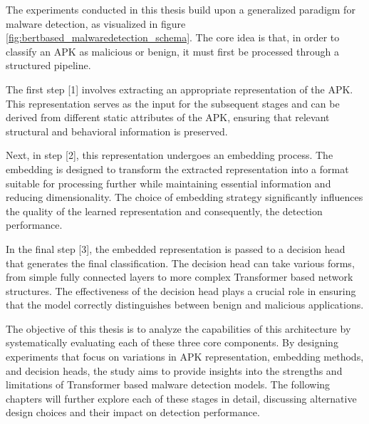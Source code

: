 The experiments conducted in this thesis build upon a generalized paradigm 
for malware detection, as visualized 
in figure \ref{fig:bertbased_malwaredetection_schema}. 
The core idea is that, in order to classify an APK as malicious or benign, 
it must first be processed through a structured pipeline.

The first step [1] involves extracting an appropriate representation of the APK. 
This representation serves as the input for the subsequent stages 
and can be derived from different static attributes of the APK, 
ensuring that relevant structural and behavioral information is preserved.

Next, in step [2], this representation undergoes an embedding process. 
The embedding is designed to transform the extracted representation into 
a format suitable for processing further while maintaining essential 
information and reducing dimensionality. 
The choice of embedding strategy significantly influences the quality 
of the learned representation and consequently, the detection performance.

In the final step [3], the embedded representation is passed to a 
decision head that generates the final classification. 
The decision head can take various forms, from simple fully connected layers
to more complex Transformer based network structures. 
The effectiveness of the decision head plays a crucial role in 
ensuring that the model correctly distinguishes between benign 
and malicious applications.

The objective of this thesis is to analyze the capabilities of 
this architecture by systematically evaluating each of these three 
core components. By designing experiments that focus on variations 
in APK representation, embedding methods, and decision heads, 
the study aims to provide insights into the strengths and limitations 
of Transformer based malware detection models. 
The following chapters will further explore each of these stages in detail, 
discussing alternative design choices and their impact on detection performance.
